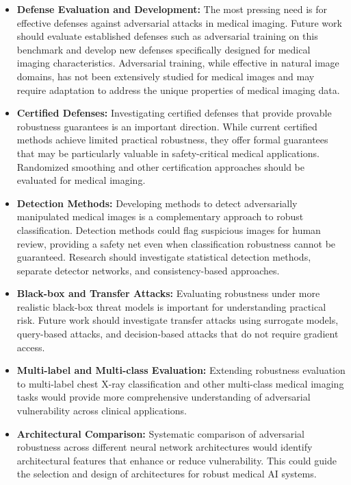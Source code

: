 \documentclass[12pt,a4paper]{article}
\begin{document}
\begin{itemize}[leftmargin=*]
    \item \textbf{Defense Evaluation and Development:} The most pressing need is for effective defenses against adversarial attacks in medical imaging. Future work should evaluate established defenses such as adversarial training on this benchmark and develop new defenses specifically designed for medical imaging characteristics. Adversarial training, while effective in natural image domains, has not been extensively studied for medical images and may require adaptation to address the unique properties of medical imaging data.
    
    \item \textbf{Certified Defenses:} Investigating certified defenses that provide provable robustness guarantees is an important direction. While current certified methods achieve limited practical robustness, they offer formal guarantees that may be particularly valuable in safety-critical medical applications. Randomized smoothing and other certification approaches should be evaluated for medical imaging.
    
    \item \textbf{Detection Methods:} Developing methods to detect adversarially manipulated medical images is a complementary approach to robust classification. Detection methods could flag suspicious images for human review, providing a safety net even when classification robustness cannot be guaranteed. Research should investigate statistical detection methods, separate detector networks, and consistency-based approaches.
    
    \item \textbf{Black-box and Transfer Attacks:} Evaluating robustness under more realistic black-box threat models is important for understanding practical risk. Future work should investigate transfer attacks using surrogate models, query-based attacks, and decision-based attacks that do not require gradient access.
    
    \item \textbf{Multi-label and Multi-class Evaluation:} Extending robustness evaluation to multi-label chest X-ray classification and other multi-class medical imaging tasks would provide more comprehensive understanding of adversarial vulnerability across clinical applications.
    
    \item \textbf{Architectural Comparison:} Systematic comparison of adversarial robustness across different neural network architectures would identify architectural features that enhance or reduce vulnerability. This could guide the selection and design of architectures for robust medical AI systems.
    

\end{itemize}
\end{document}
